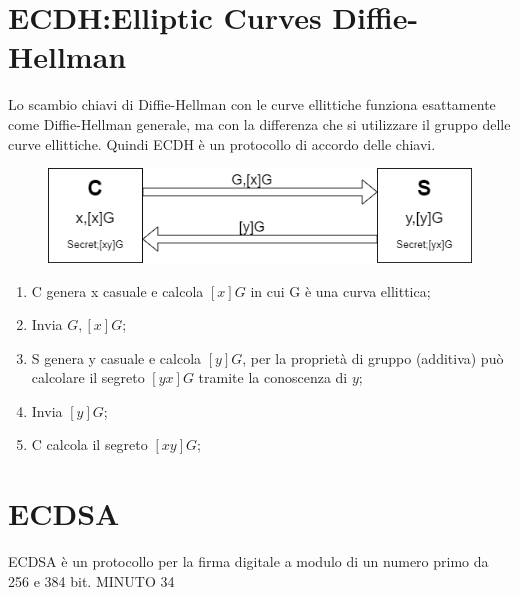 \documentclass{book}
\begin{document}
\section{ECDH:Elliptic Curves Diffie-Hellman}
Lo scambio chiavi di Diffie-Hellman con le curve ellittiche funziona esattamente come Diffie-Hellman generale, ma con la differenza che si utilizzare il gruppo delle curve ellittiche. Quindi ECDH è un protocollo di accordo delle chiavi.
\vspace*{0.5cm}
\begin{figure}[ht]
	\centering
	\includegraphics[scale=0.7]{ECDH.png}
\end{figure}
\begin{enumerate}
	\item C genera x casuale e calcola \([x]G\) in cui G è una curva ellittica;
	\item Invia \(G,[x]G\);
	\item S genera y casuale e calcola \([y]G\), per la proprietà di gruppo (additiva) può calcolare il segreto \([yx]G\) tramite la conoscenza di \(y\);
	\item Invia \([y]G\);
	\item C calcola il segreto \([xy]G\);
\end{enumerate}
\section{ECDSA}
ECDSA è un protocollo per la firma digitale a modulo di un numero primo da 256 e 384 bit.
MINUTO 34
\end{document}
